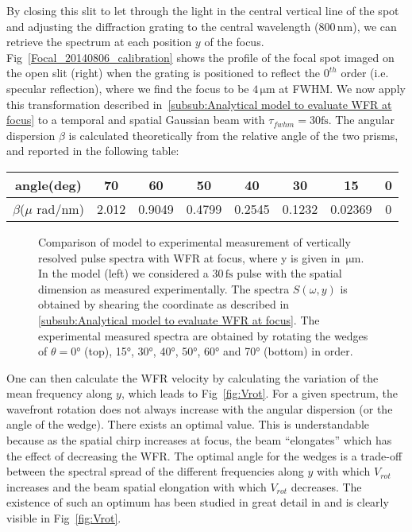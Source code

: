 \noindent  By closing this slit to let through the light in the central vertical line of the spot
and adjusting the diffraction grating to the central wavelength ($800\,\mathrm{nm}$), we can retrieve the spectrum at each position $y$ of the focus. Fig~\ref{Focal_20140806_calibration} shows the profile of the focal spot imaged on the open slit (right) when the grating is positioned to reflect the $0^{th}$ order (i.e. specular reflection), where we find the focus to be $4\,\mathrm{\mu m}$ at FWHM.
We now apply this transformation described in~\ref{subsub:Analytical model to evaluate WFR at focus} to a temporal and spatial Gaussian beam with $\tau_{fwhm} = 30 \mathrm{fs}$.
The angular dispersion $\beta$ is calculated theoretically from the relative angle of the two prisms, and reported in the following table:\\

\begin{center}
\begin{tabular}{c|c|c|c|c|c|c|c}
\hline
\hline
angle(deg) &70&60&50&40&30&15&0\\
\hline
$\beta$($\mu$ rad/nm)&2.012&0.9049&0.4799&0.2545&0.1232&0.02369&0\\
\hline
\hline
\end{tabular}
\end{center}


\begin{figure}[H]
\caption{\label{fig:SchemaFrogAtto} Comparison of model to experimental measurement of vertically resolved pulse spectra with WFR at focus, where y is given in $\,\mathrm{\mu m}$. In the model (left) we considered a $30\,\mathrm{fs}$ pulse with the spatial dimension as measured experimentally. The spectra $S(\omega,y)$ is obtained by shearing the coordinate as described in \ref{subsub:Analytical model to evaluate WFR at focus}. The experimental measured spectra are obtained by rotating the wedges of $\theta =$0° (top), 15°, 30°, 40°, 50°, 60° and 70° (bottom) in order. }
\end{figure}

\noindent One can then calculate the WFR velocity by calculating the variation of the mean frequency along $y$, which leads to Fig~\ref{fig:Vrot}. For a given spectrum, the wavefront rotation does not always increase with the angular dispersion (or the angle of the wedge). There exists an optimal value. This is understandable because as the spatial chirp increases at focus, the beam ``elongates'' which has the effect of decreasing the WFR. The optimal angle for the wedges is a trade-off between the spectral spread of the different frequencies along $y$ with which $V_{rot}$ increases and the beam spatial elongation with which $V_{rot}$ decreases. The existence of such an optimum has been studied in great detail in \cite{TheseHenri} and is clearly  visible in Fig~\ref{fig:Vrot}. 



